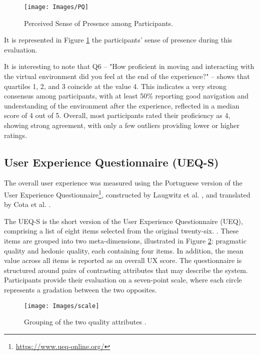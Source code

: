 \begin{figure}[h!]
    \centering
    \texttt{[image: Images/PQ]}
    \caption{Perceived Sense of Presence among Participants.} 
    \label{fig:PQ}
\end{figure}

It is represented in Figure \ref{fig:PQ} the participants’ sense of presence during this evaluation.%

It is interesting to note that Q6 – "How proficient in moving and interacting with the virtual environment did you feel at the end of the experience?" – shows that quartiles 1, 2, and 3 coincide at the value 4. 
This indicates a very strong consensus among participants, with at least 50\% reporting good navigation and understanding of the environment after the experience, reflected in a median score of 4 out of 5. 
Overall, most participants rated their proficiency as 4, showing strong agreement, with only a few outliers providing lower or higher ratings.
\subsection{User Experience Questionnaire (UEQ-S)}

The overall user experience was measured using the Portuguese version of the User Experience Questionnaire\footnote{\url{https://www.ueq-online.org/}}, constructed by Laugwitz et al. \cite{inproceedings}, and translated by Cota et al. \cite{article_t}.

The UEQ-S is the short version of the User Experience Questionnaire (UEQ), comprising a list of eight items selected from the original twenty-six. \cite{article_ueq}. These items are grouped into two meta-dimensions, illustrated in Figure \ref{fig:scale}: pragmatic quality and hedonic quality, each containing four items.
In addition, the mean value across all items is reported as an overall \gls{UX} score.
The questionnaire is structured around pairs of contrasting attributes that may describe the system. Participants provide their evaluation on a seven-point scale, where each circle represents a gradation between the two opposites.


\begin{figure}[h!]
    \centering
    \texttt{[image: Images/scale]}
    \caption{Grouping of the two quality attributes \cite{article_sca}.} 
    \label{fig:scale}
\end{figure}


